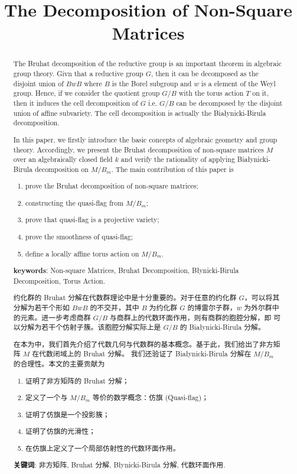\documentclass[10pt,UTF8]{article}
\title{The Decomposition of Non-Square Matrices}
\author{}
\date{}
\theoremstyle{definition}
\begin{document}
\maketitle

\begin{abstract}
  The Bruhat decomposition of the reductive group is an important theorem in algebraic group theory. Givn that 
  a reductive group $G$, then it can be decomposed as the disjoint union of $BwB$ where $B$ is the Borel
  subgroup and $w$ is a element of the Weyl group. Hence, if we consider the quotient group $G/B$ with the torus action $T$ 
  on it, then it induces the cell decomposition of $G$ i.e. $G/B$ can be decomposed by the disjoint union of affine 
  subvariety. The cell decomposition is actually the Białynicki-Birula decomposition.

  In this paper, we firstly introduce the basic concepts of algebraic geometry and group theory. 
  Accordingly, we present the Bruhat decomposition of non-square matrices $M$ over an algebraically closed field $k$ and 
  verify the rationality of applying Białynicki-Birula decomposition on $M/B_m$. The main contribution of this paper is 
  \begin{enumerate}
    \item prove the Bruhat decomposition of non-square matrices;
    \item constructing the quasi-flag from $M/B_m$;
    \item prove that quasi-flag is a projective variety;
    \item prove the smoothness of quasi-flag;
    \item define a locally affine torus action on $M/B_m$.
  \end{enumerate}
  \textbf{keywords}: Non-square Matrices, Bruhat Decomposition, Błynicki-Birula Decomposition, Torus Action.
\end{abstract}


\begin{abstract}
    约化群的 Bruhat 分解在代数群理论中是十分重要的。对于任意的约化群 $G$，可以将其分解为若干个形如 $BwB$ 的不交并，其中
    $B$ 为约化群 $G$ 的博雷尔子群，$w$ 为外尔群中的元素。进一步考虑商群 $G/B$ 与商群上的代数环面作用，则有商群的胞腔分解，即
    可以分解为若干个仿射子簇。该胞腔分解实际上是 $G/B$ 的 Białynicki-Birula 分解。

    在本为中，我们首先介绍了代数几何与代数群的基本概念。基于此，我们给出了非方矩阵 $M$ 在代数闭域上的 Bruhat 分解。
    我们还验证了 Białynicki-Birula 分解在 $M/B_m$ 的合理性。本文的主要贡献为
    \begin{enumerate}
      \item 证明了非方矩阵的 Bruhat 分解；
      \item 定义了一个与 $M/B_m$ 等价的数学概念：仿旗 (Quasi-flag)；
      \item 证明了仿旗是一个投影簇；
      \item 证明了仿旗的光滑性；
      \item 在仿旗上定义了一个局部仿射性的代数环面作用。
    \end{enumerate}
    \textbf{关键词}: 非方矩阵, Bruhat 分解, Błynicki-Birula 分解, 代数环面作用.
\end{abstract}
\newpage
\tableofcontents
\newpage
\end{document}
